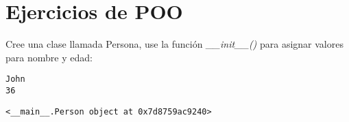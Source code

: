 \section{Ejercicios de POO}
\begin{exercise}{\rm
Cree una clase llamada Persona, use la función \emph{\_\_init\_\_()}
para asignar valores para nombre y edad:

\begin{Shaded}
\begin{Highlighting}[]
   \NormalTok{(}
    \OperatorTok{=}
    \OperatorTok{=}

\OperatorTok{=}\NormalTok{, }\NormalTok{)}

\end{Highlighting}
\end{Shaded}

\begin{verbatim}
John
36
\end{verbatim}

\begin{Shaded}
\begin{Highlighting}[]
   \NormalTok{(}
    \OperatorTok{=}
    \OperatorTok{=}

\OperatorTok{=}\NormalTok{, }\NormalTok{)}

\end{Highlighting}
\end{Shaded}

\begin{verbatim}
<__main__.Person object at 0x7d8759ac9240>
\end{verbatim}

\begin{Shaded}
\begin{Highlighting}[]
   
\OperatorTok{=}
\OperatorTok{=}


\end{Highlighting}
\end{Shaded}}
\end{exercise}
